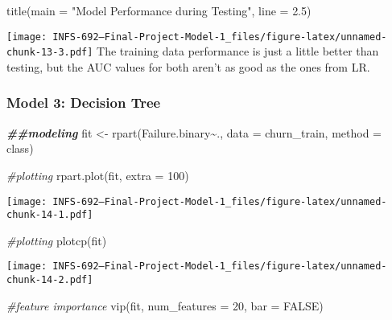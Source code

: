 \documentclass[
]{article}
\newenvironment{Shaded}{\begin{snugshade}}{\end{snugshade}}
\newcommand{\AttributeTok}[1]{\textcolor[rgb]{0.77,0.63,0.00}{#1}}
\newcommand{\CommentTok}[1]{\textcolor[rgb]{0.56,0.35,0.01}{\textit{#1}}}
\newcommand{\ConstantTok}[1]{\textcolor[rgb]{0.00,0.00,0.00}{#1}}
\newcommand{\DecValTok}[1]{\textcolor[rgb]{0.00,0.00,0.81}{#1}}
\newcommand{\DocumentationTok}[1]{\textcolor[rgb]{0.56,0.35,0.01}{\textbf{\textit{#1}}}}
\newcommand{\FloatTok}[1]{\textcolor[rgb]{0.00,0.00,0.81}{#1}}
\newcommand{\FunctionTok}[1]{\textcolor[rgb]{0.00,0.00,0.00}{#1}}
\newcommand{\NormalTok}[1]{#1}
\newcommand{\OtherTok}[1]{\textcolor[rgb]{0.56,0.35,0.01}{#1}}
\newcommand{\SpecialCharTok}[1]{\textcolor[rgb]{0.00,0.00,0.00}{#1}}
\newcommand{\StringTok}[1]{\textcolor[rgb]{0.31,0.60,0.02}{#1}}
\begin{document}
\begin{Shaded}
\begin{Highlighting}[]
\FunctionTok{title}\NormalTok{(}\AttributeTok{main =} \StringTok{"Model Performance during Testing"}\NormalTok{, }\AttributeTok{line =} \FloatTok{2.5}\NormalTok{)}
\end{Highlighting}
\end{Shaded}

\texttt{[image: INFS-692---Final-Project-Model-1\_files/figure-latex/unnamed-chunk-13-3.pdf]}
The training data performance is just a little better than testing, but
the AUC values for both aren't as good as the ones from LR.

\hypertarget{model-3-decision-tree}{%
\subsubsection{Model 3: Decision Tree}\label{model-3-decision-tree}}

\begin{Shaded}
\begin{Highlighting}[]
\DocumentationTok{\#\#modeling}
\NormalTok{fit }\OtherTok{\textless{}{-}} \FunctionTok{rpart}\NormalTok{(Failure.binary}\SpecialCharTok{\textasciitilde{}}\NormalTok{., }\AttributeTok{data =}\NormalTok{ churn\_train, }\AttributeTok{method =} \StringTok{\textquotesingle{}class\textquotesingle{}}\NormalTok{)}

\CommentTok{\#plotting}
\FunctionTok{rpart.plot}\NormalTok{(fit, }\AttributeTok{extra =} \DecValTok{100}\NormalTok{)}
\end{Highlighting}
\end{Shaded}

\texttt{[image: INFS-692---Final-Project-Model-1\_files/figure-latex/unnamed-chunk-14-1.pdf]}

\begin{Shaded}
\begin{Highlighting}[]
\CommentTok{\#plotting}
\FunctionTok{plotcp}\NormalTok{(fit)}
\end{Highlighting}
\end{Shaded}

\texttt{[image: INFS-692---Final-Project-Model-1\_files/figure-latex/unnamed-chunk-14-2.pdf]}

\begin{Shaded}
\begin{Highlighting}[]
\CommentTok{\#feature importance}
\FunctionTok{vip}\NormalTok{(fit, }\AttributeTok{num\_features =} \DecValTok{20}\NormalTok{, }\AttributeTok{bar =} \ConstantTok{FALSE}\NormalTok{)}
\end{Highlighting}
\end{Shaded}
\end{document}
